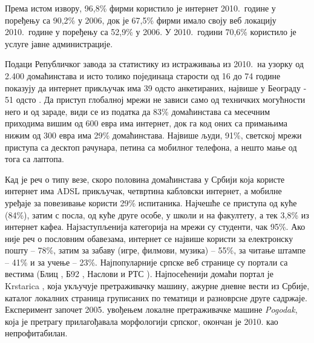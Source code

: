 \begin{multicols}{2}

Према истом извору, 96,8\% фирми користило је интернет 2010.~године у поређењу са 90,2\% у  2006, док је 67,5\% фирми имало  своју веб локацију 2010.~године у поређењу са 52,9\% у 2006. У 2010.~години 70,6\% користило је услуге јавне администрације.

Подаци Републичког завода за статистику из истраживања из 2010.~на узорку од 2.400 домаћинстава и исто толико појединаца старости од 16 до 74 године показују да интернет прикључак има 39 одсто анкетираних, највише у Београду - 51 одсто \cite{ICT2010}. Да приступ глобалној мрежи не зависи само од техничких могућности него и од зараде, види се из податка да 83\% домаћинстава са месечним приходима вишим од 600 евра има интернет, док га код оних са примањима нижим од 300 евра има 29\% домаћинстава. Највише људи, 91\%, светској мрежи приступа са десктоп рачунара, петина са мобилног телефона, а нешто мање од тога са лаптопа. 

Кад је реч о типу везе, скоро половина домаћинстава у Србији која користе интернет има ADSL прикључак, четвртина кабловски интернет, а мобилне уређаје за повезивање користи 29\% испитаника. Најчешће се приступа од куће (84\%), затим с посла, од куће друге особе, у школи и на факултету, а  тек 3,8\% из интернет кафеа. Најзаступљенија категорија на мрежи су студенти, чак 95\%. Ако није реч о пословним обавезама, интернет се највише користи за електронску пошту – 78\%, затим за забаву (игре, филмови, музика) – 55\%, за читање штампе – 41\% и за учење – 23\%. Најпопуларније српске веб странице су портали са вестима (Блиц \cite{BLIC}, Б92 \cite{B92}, Наслови \cite{NASLOVI} и РТС \cite{RTS}). Најпосећенији домаћи портал је Krstarica \cite{KRSTARICA},  која укључује претраживачку машину, ажурне дневне вести из Србије, каталог локалних страница груписаних по тематици и разноврсне друге садржаје. Експеримент започет 2005.  увођењем локалне претраживачке машине \textit{Pogodak}, која је претрагу прилагођавала морфологији српског, окончан је 2010. као непрофитабилан. 


\end{multicols}
